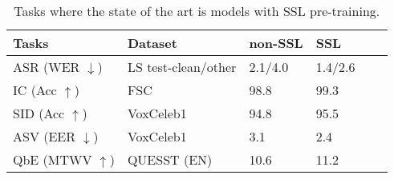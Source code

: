 \begin{table}[ht]
  \centering
  \footnotesize
  \caption{Tasks where the state of the art is models with SSL pre-training.}
  \label{table:sota_performance}
  \renewcommand*\arraystretch{1.2}
  \begin{tabular}{llllll}  
    \toprule
    Tasks & Dataset & non-SSL & SSL \\
    \midrule
    ASR (WER $\downarrow$) & LS test-clean/other & 2.1/4.0 \cite{xu2020iterative} & 1.4/2.6 \cite{zhang2020pushing} \\ \hline
    IC (Acc $\uparrow$) & FSC & 98.8 \cite{lugosch19_interspeech} & 99.3\cite{chen2021unispeechsat} \\ \hline
    SID (Acc $\uparrow$) & VoxCeleb1 & 94.8 \cite{hajibabaei2018unified} & 95.5 \cite{chen2021wavlm} \\ \hline
    ASV (EER $\downarrow$) & VoxCeleb1 & 3.1 \cite{hajavi2021siamese} & 2.4 \cite{wang2021fine} \\ \hline
    QbE (MTWV $\uparrow$) & QUESST (EN) & 10.6 \cite{rodriguez2014gtts} & 11.2\cite{chen2021unispeechsat} \\


    \bottomrule
  \end{tabular}
\end{table}

